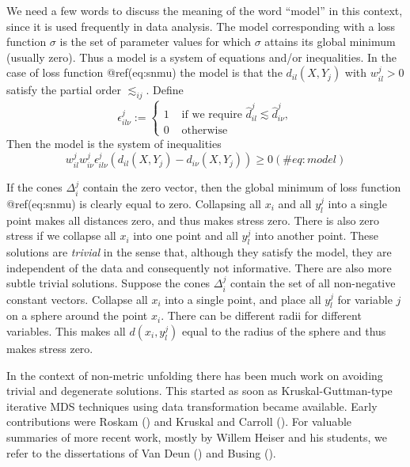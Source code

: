 \documentclass[
  12pt,
  letterpaper,
  DIV=11,
  numbers=noendperiod]{scrartcl}
\begin{document}
We need a few words to discuss the meaning of the word ``model'' in this
context, since it is used frequently in data analysis. The model
corresponding with a loss function \(\sigma\) is the set of parameter
values for which \(\sigma\) attains its global minimum (usually zero).
Thus a model is a system of equations and/or inequalities. In the case
of loss function @ref(eq:snmu) the model is that the \(d_{il}(X,Y_j)\)
with \(w_{il}^j>0\) satisfy the partial order \(\lesssim_{ij}\). Define
\begin{equation}
\epsilon^j_{il\nu}:=
\begin{cases}
1&\text{ if we require }\hat d^j_{il}\lesssim\hat d^j_{i\nu},\\
0&\text{ otherwise}
\end{cases}
\end{equation} Then the model is the system of inequalities
\begin{equation}
w_{il}^jw_{i\nu}^j\epsilon^j_{il\nu}(d_{il}(X,Y_j)-d_{i\nu}(X,Y_j))\geq 0
(\#eq:model)
\end{equation}

If the cones \(\Delta_i^j\) contain the zero vector, then the global
minimum of loss function @ref(eq:snmu) is clearly equal to zero.
Collapsing all \(x_i\) and all \(y_l^j\) into a single point makes all
distances zero, and thus makes stress zero. There is also zero stress if
we collapse all \(x_i\) into one point and all \(y_l^j\) into another
point. These solutions are \emph{trivial} in the sense that, although
they satisfy the model, they are independent of the data and
consequently not informative. There are also more subtle trivial
solutions. Suppose the cones \(\Delta_i^j\) contain the set of all
non-negative constant vectors. Collapse all \(x_i\) into a single point,
and place all \(y_l^j\) for variable \(j\) on a sphere around the point
\(x_i\). There can be different radii for different variables. This
makes all \(d(x_i,y_l^j)\) equal to the radius of the sphere and thus
makes stress zero.

In the context of non-metric unfolding there has been much work on
avoiding trivial and degenerate solutions. This started as soon as
Kruskal-Guttman-type iterative MDS techniques using data transformation
became available. Early contributions were Roskam
() and Kruskal and Carroll
(). For valuable summaries of
more recent work, mostly by Willem Heiser and his students, we refer to
the dissertations of Van Deun () and
Busing ().
\end{document}
